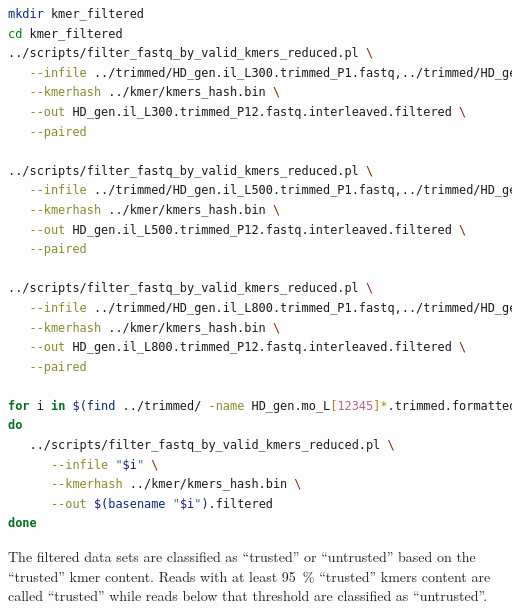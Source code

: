 \documentclass[12pt,a4paper]{scrartcl}
\begin{document}
\begin{lstlisting}[language=bash]
mkdir kmer_filtered
cd kmer_filtered
../scripts/filter_fastq_by_valid_kmers_reduced.pl \
   --infile ../trimmed/HD_gen.il_L300.trimmed_P1.fastq,../trimmed/HD_gen.il_L300.trimmed_P2.fastq \
   --kmerhash ../kmer/kmers_hash.bin \
   --out HD_gen.il_L300.trimmed_P12.fastq.interleaved.filtered \
   --paired

../scripts/filter_fastq_by_valid_kmers_reduced.pl \
   --infile ../trimmed/HD_gen.il_L500.trimmed_P1.fastq,../trimmed/HD_gen.il_L500.trimmed_P2.fastq \
   --kmerhash ../kmer/kmers_hash.bin \
   --out HD_gen.il_L500.trimmed_P12.fastq.interleaved.filtered \
   --paired

../scripts/filter_fastq_by_valid_kmers_reduced.pl \
   --infile ../trimmed/HD_gen.il_L800.trimmed_P1.fastq,../trimmed/HD_gen.il_L800.trimmed_P2.fastq \
   --kmerhash ../kmer/kmers_hash.bin \
   --out HD_gen.il_L800.trimmed_P12.fastq.interleaved.filtered \
   --paired

for i in $(find ../trimmed/ -name HD_gen.mo_L[12345]*.trimmed.formatted.fastq)
do
   ../scripts/filter_fastq_by_valid_kmers_reduced.pl \
      --infile "$i" \
      --kmerhash ../kmer/kmers_hash.bin \
      --out $(basename "$i").filtered
done
\end{lstlisting}

The filtered data sets are classified as ``trusted'' or ``untrusted''
based on the ``trusted'' kmer content. Reads with at least
\SI{95}{\percent} ``trusted'' kmers content are called ``trusted''
while reads below that threshold are classified as ``untrusted''.
\end{document}
